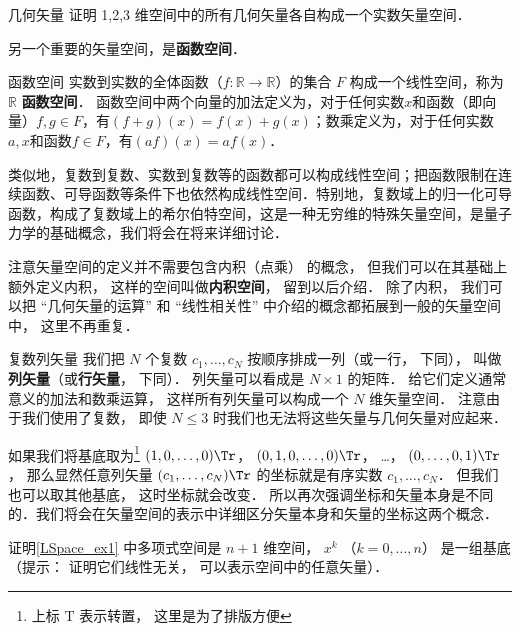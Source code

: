 \begin{exercise}{几何矢量}
证明 1,2,3 维空间中的所有几何矢量各自构成一个实数矢量空间．
\end{exercise}

另一个重要的矢量空间，是\textbf{函数空间}．

\begin{example}{函数空间}\label{LSpace_ex2}
实数到实数的全体函数（$f:\mathbb R \to \mathbb R$）的集合 $F$ 构成一个线性空间，称为 $\mathbb{R}$ \textbf{函数空间}． 函数空间中两个向量的加法定义为，对于任何实数$x$和函数（即向量）$f, g\in F$，有$(f+g)(x)=f(x)+g(x)$；数乘定义为，对于任何实数$a, x$和函数$f\in F$，有$(af)(x)=af(x)$．

类似地，复数到复数、实数到复数等的函数都可以构成线性空间；把函数限制在连续函数、可导函数等条件下也依然构成线性空间．特别地，复数域上的归一化可导函数，构成了复数域上的希尔伯特空间，这是一种无穷维的特殊矢量空间，是量子力学的基础概念，我们将会在将来详细讨论．
\end{example}

注意矢量空间的定义并不需要包含内积（点乘） 的概念， 但我们可以在其基础上额外定义内积， 这样的空间叫做\textbf{内积空间}， 留到以后介绍． 除了内积， 我们可以把 “几何矢量的运算” 和 “线性相关性” 中介绍的概念都拓展到一般的矢量空间中， 这里不再重复．

\begin{exercise}{复数列矢量}
我们把 $N$ 个复数 $c_1, \dots, c_N$ 按顺序排成一列（或一行， 下同）， 叫做\textbf{列矢量}（或\textbf{行矢量}， 下同）． 列矢量可以看成是 $N \times 1$ 的矩阵． 给它们定义通常意义的加法和数乘运算， 这样所有列矢量可以构成一个 $N$ 维矢量空间． 注意由于我们使用了复数， 即使 $N \leqslant 3$ 时我们也无法将这些矢量与几何矢量对应起来．

如果我们将基底取为\footnote{上标 $\mathrm T$ 表示转置， 这里是为了排版方便} $(1, 0, \dots, 0)\Tr$， $(0, 1, 0, \dots, 0)\Tr$， …， $(0, \dots, 0, 1)\Tr$， 那么显然任意列矢量 $(c_1, \dots, c_N)\Tr$ 的坐标就是有序实数 $c_1, \dots, c_N$． 但我们也可以取其他基底， 这时坐标就会改变． 所以再次强调坐标和矢量本身是不同的．我们将会在矢量空间的表示中详细区分矢量本身和矢量的坐标这两个概念．
\end{exercise}

\begin{exercise}{}
证明\autoref{LSpace_ex1} 中多项式空间是 $n+1$ 维空间， $x^k$ （$k = 0, \dots, n$） 是一组基底（提示： 证明它们线性无关， 可以表示空间中的任意矢量）．
\end{exercise}





